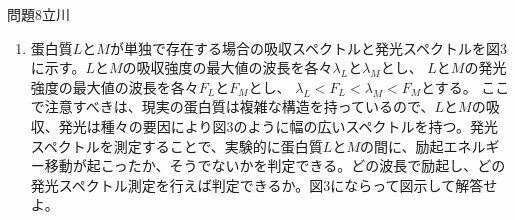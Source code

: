 \documentclass[fleqn]{jbook}
\begin{document}
\begin{question}{問題8}{立川}
\begin{enumerate}
\begin{enumerate}
\item 配向因子$\kappa^2$は$\b F_L$と$\b A_M$の相対角度は位置によって大きく変化するし、この相対配置を試料溶液中の蛋白質で決定するのは一般に大変困難である。従って$\tau/\tau'$の値の観測だけでは、蛋白質$L$と$M$の距離$R$の変化を決定することは出来ない。ところが、発光体が蛋白質内で3次元方向に全く自由に速く運動している時は、$\kappa^2$の値は$2/3$であり、このときは蛋白質$L$と$M$の距離を計算することが出来る。$\kappa^2=2/3$の場合、蛋白質$L$と$M$が複合体を作った場合と、複合体を作らずおたがい離れて2次元膜上を運動している時とを比べる。蛋白質$L$の$\tau'/\tau$は$R/R_0$の変化に対してどのように変化するか。定性的に図示し、縦軸と横軸に特徴的な値を記入せよ。但しこのとき、蛋白質の直径は同じ$R_0/2$であるとし、発光体の中心は円筒型蛋白質の中心と一致するとする。
\end{enumerate}\newpage
\item 蛋白質$L$と$M$が単独で存在する場合の吸収スペクトルと発光スペクトルを図3に示す。$L$と$M$の吸収強度の最大値の波長を各々$\lambda_L$と$\lambda_M$とし、
$L$と$M$の発光強度の最大値の波長を各々$F_L$と$F_M$とし、
$\lambda_L<F_L<\lambda_M<F_M$とする。
ここで注意すべきは、現実の蛋白質は複雑な構造を持っているので、$L$と$M$の吸収、発光は種々の要因により図3のように幅の広いスペクトルを持つ。発光スペクトルを測定することで、実験的に蛋白質$L$と$M$の間に、励起エネルギー移動が起こったか、そうでないかを判定できる。どの波長で励起し、どの発光スペクトル測定を行えば判定できるか。図3にならって図示して解答せよ。
\end{enumerate}
\begin{center}

\end{center}
\end{question}
\end{document}
